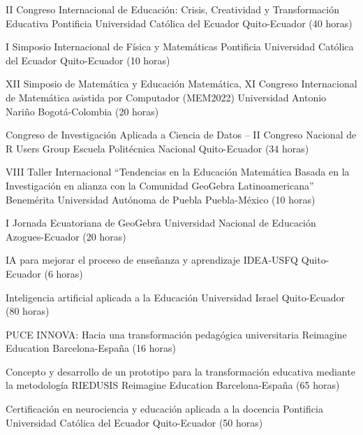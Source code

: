 \documentclass[
	a4paper,
	maincolor=cvblue!70!blue,
	sidecolor=gray!30,
	sectioncolor=cvblue!70!blue,
    sidebarwidth=7.5cm,
	topbottommargin=20pt,
	leftrightmargin=20pt,
]{fortysecondscv}
\begin{document}

    {II Congreso Internacional de Educación: Crisis, Creatividad y Transformación Educativa}
    {Pontificia Universidad Católica del Ecuador}
    {Quito-Ecuador (40 horas)}

    {I Simposio Internacional de Física y Matemáticas}
    {Pontificia Universidad Católica del Ecuador}
    {Quito-Ecuador (10 horas)}

    {XII Simposio de Matemática y Educación Matemática, XI Congreso Internacional de Matemática asistida por Computador (MEM2022)}
    {Universidad Antonio Nariño}
    {Bogotá-Colombia (20 horas)}

    {Congreso de Investigación Aplicada a Ciencia de Datos – II Congreso Nacional de R Users Group}
    {Escuela Politécnica Nacional}
    {Quito-Ecuador (34 horas)}

    {VIII Taller Internacional “Tendencias en la Educación Matemática Basada en la Investigación en alianza con la Comunidad GeoGebra Latinoamericana”}
    {Benemérita Universidad Autónoma de Puebla}
    {Puebla-México (10 horas)}

    {I Jornada Ecuatoriana de GeoGebra}
    {Universidad Nacional de Educación}
    {Azogues-Ecuador (20 horas)}


    {IA para mejorar el proceso de enseñanza y aprendizaje}
    {IDEA-USFQ}
    {Quito-Ecuador (6 horas)}

    {Inteligencia artificial aplicada a la Educación}
    {Universidad Israel}
    {Quito-Ecuador (80 horas)}

    {PUCE INNOVA: Hacia una transformación pedagógica universitaria}
    {Reimagine Education}
    {Barcelona-España (16 horas)}

    {Concepto y desarrollo de un prototipo para la transformación educativa mediante la metodología RIEDUSIS}
    {Reimagine Education}
    {Barcelona-España (65 horas)}

    {Certificación en neurociencia y educación aplicada a la docencia}
    {Pontificia Universidad Católica del Ecuador}
    {Quito-Ecuador (50 horas)}
\end{document}
